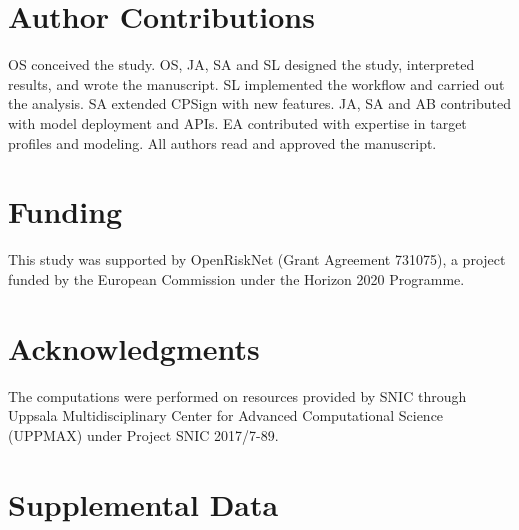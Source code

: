 \documentclass[utf8]{frontiersSCNS} %
\begin{document}
\section*{Author Contributions}
OS conceived the study. OS, JA, SA and SL designed the study, interpreted
results, and wrote the manuscript. SL implemented the workflow and carried out
the analysis. SA extended CPSign with new features. JA, SA and AB contributed
with model deployment and APIs. EA contributed with expertise in target
profiles and modeling. All authors read and approved the manuscript.



\section*{Funding}
This study was supported by OpenRiskNet (Grant Agreement 731075), a project
funded by the European Commission under the Horizon 2020 Programme.

\section*{Acknowledgments}
The computations were performed on resources provided by SNIC through Uppsala
Multidisciplinary Center for Advanced Computational Science (UPPMAX) under
Project SNIC 2017/7-89.



\newpage
\appendix
\section*{Supplemental Data}
%
%
\end{document}
